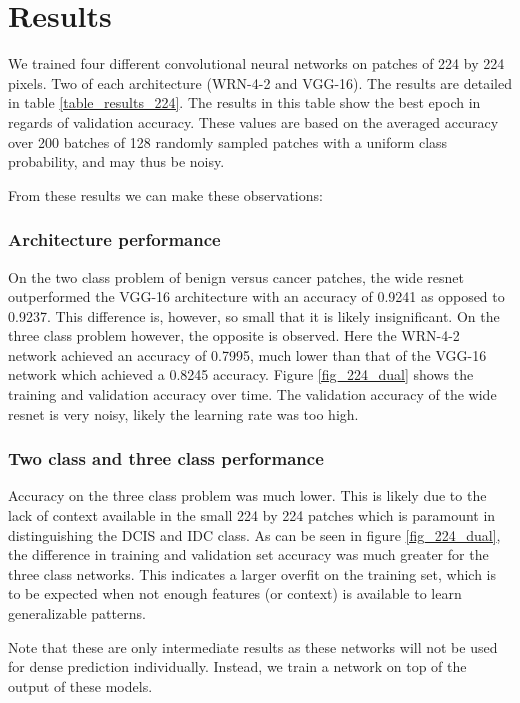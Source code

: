 \documentclass[journal]{IEEEtran}
\begin{document}
\section{Results}


We trained four different convolutional neural networks on patches of 224 by 224 pixels. Two of each architecture (WRN-4-2 and VGG-16). The results are detailed in table \ref{table_results_224}. The results in this table show the best epoch in regards of validation accuracy. These values are based on the averaged accuracy over 200 batches of 128 randomly sampled patches with a uniform class probability, and may thus be noisy. 



From these results we can make these observations:

\subsubsection{Architecture performance}
On the two class problem of benign versus cancer patches, the wide resnet outperformed the VGG-16 architecture with an accuracy of 0.9241 as opposed to 0.9237. This difference is, however, so small that it is likely insignificant. On the three class problem however, the opposite is observed. Here the WRN-4-2 network achieved an accuracy of 0.7995, much lower than that of the VGG-16 network which achieved a 0.8245 accuracy. Figure \ref{fig_224_dual} shows the training and validation accuracy over time. The validation accuracy of the wide resnet is very noisy, likely the learning rate was too high.

\subsubsection{Two class and three class performance}
Accuracy on the three class problem was much lower. This is likely due to the lack of context available in the small 224 by 224 patches which is paramount in distinguishing the DCIS and IDC class. As can be seen in figure \ref{fig_224_dual}, the difference in training and validation set accuracy was much greater for the three class networks. This indicates a larger overfit on the training set, which is to be expected when not enough features (or context) is available to learn generalizable patterns.

Note that these are only intermediate results as these networks will not be used for dense prediction individually. Instead, we train a network on top of the output of these models. 
\end{document}
